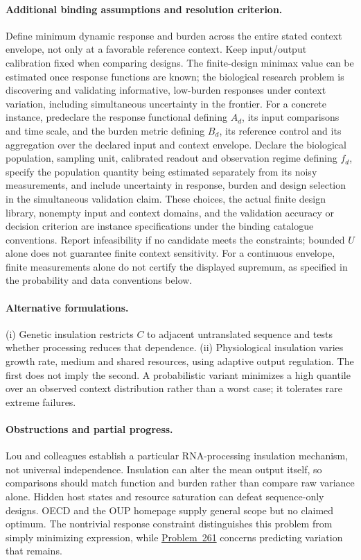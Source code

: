 \documentclass[11pt]{article}
\begin{document}
\paragraph{Additional binding assumptions and resolution criterion.} Define minimum dynamic response and burden across the entire stated context envelope, not only at a favorable reference context. Keep input/output calibration fixed when comparing designs. The finite-design minimax value can be estimated once response functions are known; the biological research problem is discovering and validating informative, low-burden responses under context variation, including simultaneous uncertainty in the frontier. For a concrete instance, predeclare the response functional defining $A_d$, its input comparisons and time scale, and the burden metric defining $B_d$, its reference control and its aggregation over the declared input and context envelope. Declare the biological population, sampling unit, calibrated readout and observation regime defining $f_d$, specify the population quantity being estimated separately from its noisy measurements, and include uncertainty in response, burden and design selection in the simultaneous validation claim. These choices, the actual finite design library, nonempty input and context domains, and the validation accuracy or decision criterion are instance specifications under the binding catalogue conventions. Report infeasibility if no candidate meets the constraints; bounded $U$ alone does not guarantee finite context sensitivity. For a continuous envelope, finite measurements alone do not certify the displayed supremum, as specified in the probability and data conventions below.

\paragraph{Alternative formulations.} (i) Genetic insulation restricts $C$ to adjacent untranslated sequence and tests whether processing reduces that dependence. (ii) Physiological insulation varies growth rate, medium and shared resources, using adaptive output regulation. The first does not imply the second. A probabilistic variant minimizes a high quantile over an observed context distribution rather than a worst case; it tolerates rare extreme failures.

\paragraph{Obstructions and partial progress.} Lou and colleagues establish a particular RNA-processing insulation mechanism, not universal independence. Insulation can alter the mean output itself, so comparisons should match function and burden rather than compare raw variance alone. Hidden host states and resource saturation can defeat sequence-only designs. OECD and the OUP homepage supply general scope but no claimed optimum. The nontrivial response constraint distinguishes this problem from simply minimizing expression, while \href{https://we-solve.github.io/problems/predictable-genetic-parts-0b05cc84/}{Problem~261} concerns predicting variation that remains.
\end{document}
